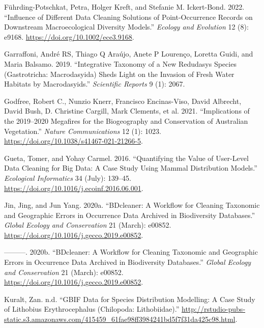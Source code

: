 \documentclass[
  letterpaper,
  DIV=11,
  numbers=noendperiod,
  oneside]{scrreprt}
\newlength{\cslhangindent}
\newlength{\cslentryspacingunit} %
\newenvironment{CSLReferences}[2] %
 {%
  \setlength{\parindent}{0pt}
  \ifodd #1
  \let\oldpar\par
  \def\par{\hangindent=\cslhangindent\oldpar}
  \fi
  \setlength{\parskip}{#2\cslentryspacingunit}
 }%
 {}
\begin{document}
\hypertarget{refs}{}
\begin{CSLReferences}{1}{0}
\leavevmode{}%
Führding-Potschkat, Petra, Holger Kreft, and Stefanie M. Ickert-Bond.
2022. {``Influence of Different Data Cleaning Solutions of
Point-Occurrence Records on Downstream Macroecological Diversity
Models.''} \emph{Ecology and Evolution} 12 (8): e9168.
\url{https://doi.org/10.1002/ece3.9168}.

\leavevmode{}%
Garraffoni, André RS, Thiago Q Araújo, Anete P Lourenço, Loretta Guidi,
and Maria Balsamo. 2019. {``Integrative Taxonomy of a New Redudasys
Species (Gastrotricha: Macrodasyida) Sheds Light on the Invasion of
Fresh Water Habitats by Macrodasyids.''} \emph{Scientific Reports} 9
(1): 2067.

\leavevmode{}%
Godfree, Robert C., Nunzio Knerr, Francisco Encinas-Viso, David
Albrecht, David Bush, D. Christine Cargill, Mark Clements, et al. 2021.
{``Implications of the 2019--2020 Megafires for the Biogeography and
Conservation of {Australian} Vegetation.''} \emph{Nature Communications}
12 (1): 1023. \url{https://doi.org/10.1038/s41467-021-21266-5}.

\leavevmode{}%
Gueta, Tomer, and Yohay Carmel. 2016. {``Quantifying the Value of
User-Level Data Cleaning for Big Data: {A} Case Study Using Mammal
Distribution Models.''} \emph{Ecological Informatics} 34 (July):
139--45. \url{https://doi.org/10.1016/j.ecoinf.2016.06.001}.

\leavevmode{}%
Jin, Jing, and Jun Yang. 2020a. {``{BDcleaner}: {A} Workflow for
Cleaning Taxonomic and Geographic Errors in Occurrence Data Archived in
Biodiversity Databases.''} \emph{Global Ecology and Conservation} 21
(March): e00852. \url{https://doi.org/10.1016/j.gecco.2019.e00852}.

\leavevmode{}%
---------. 2020b. {``BDcleaner: A Workflow for Cleaning Taxonomic and
Geographic Errors in Occurrence Data Archived in Biodiversity
Databases.''} \emph{Global Ecology and Conservation} 21 (March): e00852.
\url{https://doi.org/10.1016/j.gecco.2019.e00852}.

\leavevmode{}%
Kuralt, Zan. n.d. {``GBIF Data for Species Distribution Modelling: A
Case Study of Lithobius Erythrocephalus (Chilopoda: Lithobiidae).''}
\url{http://rstudio-pubs-static.s3.amazonaws.com/415459_61fae98ff3984241bd5f7f31da425c98.html}.


\end{CSLReferences}
\end{document}
